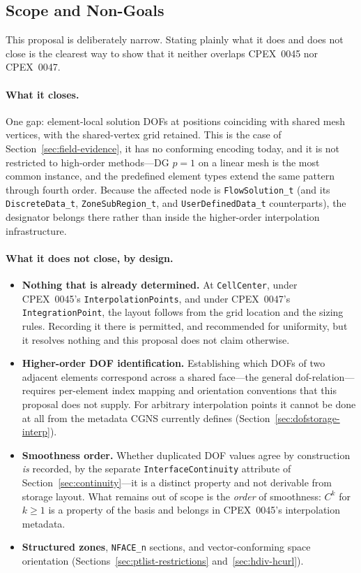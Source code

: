 \documentclass[11pt,letterpaper]{article}
\begin{document}
\subsection{Scope and Non-Goals}
\label{sec:scope}

This proposal is deliberately narrow.  Stating plainly what it does and
does not close is the clearest way to show that it neither overlaps
CPEX~0045 nor CPEX~0047.

\paragraph{What it closes.}  One gap: element-local solution DOFs at
positions coinciding with shared mesh vertices, with the shared-vertex
grid retained.  This is the case of
Section~\ref{sec:field-evidence}, it has no conforming encoding today,
and it is not restricted to high-order methods---DG $p=1$ on a linear
mesh is the most common instance, and the predefined element types
extend the same pattern through fourth order.  Because the affected
node is \texttt{FlowSolution\_t} (and its \texttt{DiscreteData\_t},
\texttt{ZoneSubRegion\_t}, and \texttt{UserDefinedData\_t}
counterparts), the designator belongs there rather than inside the
higher-order interpolation infrastructure.

\paragraph{What it does not close, by design.}

\begin{itemize}[leftmargin=2em]
\item \textbf{Nothing that is already determined.}  At
  \texttt{CellCenter}, under CPEX~0045's
  \texttt{InterpolationPoints}, and under CPEX~0047's
  \texttt{IntegrationPoint}, the layout follows from the grid location
  and the sizing rules.  Recording it there is permitted, and
  recommended for uniformity, but it resolves nothing and this
  proposal does not claim otherwise.
\item \textbf{Higher-order DOF identification.}  Establishing which
  DOFs of two adjacent elements correspond across a shared face---the
  general dof-relation---requires per-element index mapping and
  orientation conventions that this proposal does not supply.  For
  arbitrary interpolation points it cannot be done at all from the
  metadata CGNS currently defines
  (Section~\ref{sec:dofstorage-interp}).
\item \textbf{Smoothness order.}  Whether duplicated DOF values agree by
  construction \emph{is} recorded, by the separate
  \texttt{InterfaceContinuity} attribute of
  Section~\ref{sec:continuity}---it is a distinct property and not
  derivable from storage layout.  What remains out of scope is the
  \emph{order} of smoothness: $C^k$ for $k \geq 1$ is a property of the
  basis and belongs in CPEX~0045's interpolation metadata.
\item \textbf{Structured zones}, \texttt{NFACE\_n} sections, and
  vector-conforming space orientation
  (Sections~\ref{sec:ptlist-restrictions} and~\ref{sec:hdiv-hcurl}).
\end{itemize}
\end{document}
